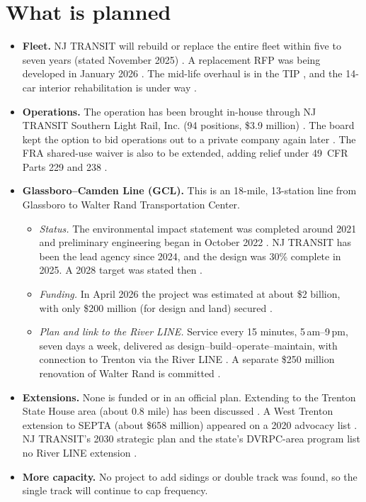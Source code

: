 \documentclass[11pt]{article}
\begin{document}
\section{What is planned}\label{sec:plans}
\begin{itemize}
\item \textbf{Fleet.} NJ TRANSIT will rebuild or replace the entire fleet within five to seven years (stated November 2025) \citep{centraljersey2025}. A replacement RFP was being developed in January 2026 \citep{njt2026rehab}. The mid-life overhaul is in the TIP \citep{njtpa_tip}, and the 14-car interior rehabilitation is under way \citep{njt2026rehab}.
\item \textbf{Operations.} The operation has been brought in-house through NJ TRANSIT Southern Light Rail, Inc. (94 positions, \$3.9 million) \citep{njt2025board,njt2026board}. The board kept the option to bid operations out to a private company again later \citep{njt2025board}. The FRA shared-use waiver is also to be extended, adding relief under 49~CFR Parts 229 and 238 \citep{fr2026waiver}.
\item \textbf{Glassboro--Camden Line (GCL).} This is an 18-mile, 13-station line from Glassboro to Walter Rand Transportation Center.
  \begin{itemize}
  \item \emph{Status.} The environmental impact statement was completed around 2021 and preliminary engineering began in October 2022 \citep{gcl_timeline,whyy2021gcl}. NJ TRANSIT has been the lead agency since 2024, and the design was 30\% complete in 2025. A 2028 target was stated then \citep{cbs2025gcl}.
  \item \emph{Funding.} In April 2026 the project was estimated at about \$2 billion, with only \$200 million (for design and land) secured \citep{inquirer2026gcl}.
  \item \emph{Plan and link to the River LINE.} Service every 15 minutes, 5\,am--9\,pm, seven days a week, delivered as design--build--operate--maintain, with connection to Trenton via the River LINE \citep{gcl_faq}. A separate \$250 million renovation of Walter Rand is committed \citep{cbs2025gcl}.
  \end{itemize}
\item \textbf{Extensions.} None is funded or in an official plan. Extending to the Trenton State House area (about 0.8 mile) has been discussed \citep{tcnj2017}. A West Trenton extension to SEPTA (about \$658 million) appeared on a 2020 advocacy list \citep{tstc2020}. NJ TRANSIT's 2030 strategic plan and the state's DVRPC-area program list no River LINE extension \citep{njt2030,nj_stip_dvrpc}.
\item \textbf{More capacity.} No project to add sidings or double track was found, so the single track will continue to cap frequency.
\end{itemize}
\end{document}
